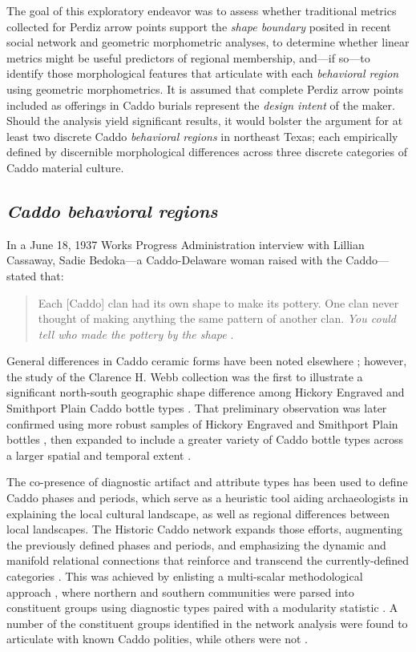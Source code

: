 \documentclass[smallextended]{svjour3}       %
\begin{document}
The goal of this exploratory endeavor was to assess whether traditional
metrics collected for Perdiz arrow points support the \emph{shape
boundary} posited in recent social network and geometric morphometric
analyses, to determine whether linear metrics might be useful predictors
of regional membership, and---if so---to identify those morphological
features that articulate with each \emph{behavioral region} using
geometric morphometrics. It is assumed that complete Perdiz arrow points
included as offerings in Caddo burials represent the \emph{design
intent} of the maker. Should the analysis yield significant results, it
would bolster the argument for at least two discrete Caddo
\emph{behavioral regions} in northeast Texas; each empirically defined
by discernible morphological differences across three discrete
categories of Caddo material culture.

\hypertarget{caddo-behavioral-regions}{%
\subsection{\texorpdfstring{\emph{Caddo behavioral
regions}}{Caddo behavioral regions}}\label{caddo-behavioral-regions}}

In a June 18, 1937 Works Progress Administration interview with Lillian
Cassaway, Sadie Bedoka---a Caddo-Delaware woman raised with the
Caddo---stated that:

\begin{quote}
Each {[}Caddo{]} clan had its own shape to make its pottery. One clan
never thought of making anything the same pattern of another clan.
\emph{You could tell who made the pottery by the shape}
\cite[395]{RN9357x}.
\end{quote}

General differences in Caddo ceramic forms have been noted elsewhere
\cite{RN5650,RN7162}; however, the study of the Clarence H. Webb
collection was the first to illustrate a significant north-south
geographic shape difference among Hickory Engraved and Smithport Plain
Caddo bottle types \cite{RN8370}. That preliminary observation was later
confirmed using more robust samples of Hickory Engraved and Smithport
Plain bottles \cite{RN8074,RN7927}, then expanded to include a greater
variety of Caddo bottle types across a larger spatial and temporal
extent \cite{RN8312}.

The co-presence of diagnostic artifact and attribute types has been used
to define Caddo phases and periods, which serve as a heuristic tool
aiding archaeologists in explaining the local cultural landscape, as
well as regional differences between local landscapes. The Historic
Caddo network expands those efforts, augmenting the previously defined
phases and periods, and emphasizing the dynamic and manifold relational
connections that reinforce and transcend the currently-defined
categories \cite{RN8031}. This was achieved by enlisting a multi-scalar
methodological approach \cite{RN5644,RN8039}, where northern and
southern communities were parsed into constituent groups using
diagnostic types paired with a modularity statistic
\cite{RN8051,RN8024}. A number of the constituent groups identified in
the network analysis were found to articulate with known Caddo polities,
while others were not \cite{RN8031}.
\end{document}
